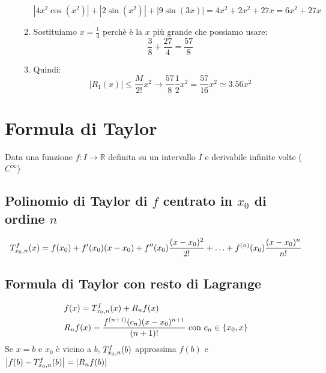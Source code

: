 \documentclass[10pt, a4paper]{article}
\begin{document}
\begin{itemize}
\begin{enumerate}
\begin{equation*}
                    \left|4x^2\cos(x^2)\right|+\left|2\sin(x^2)\right|+\left|9\sin(3x)\right|=4x^2+2x^2+27x=6x^2+27x
                \end{equation*}
                \item Sostituiamo $x=\frac{1}{4}$ perchè è la $x$ più grande che possiamo usare: \begin{equation*}
                    \frac{3}{8}+\frac{27}{4}=\frac{57}{8}
                \end{equation*}
                \item Quindi: \begin{equation*}
                    \left|R_1(x)\right|\leq \frac{M}{2!}x^2\rightarrow\frac{57}{8}\frac{1}{2}x^2=\frac{57}{16}x^2\simeq 3.56x^2
                \end{equation*}
            \end{enumerate}
        \end{itemize}
\newpage
\section{Formula di Taylor}
    Data una funzione $f:I\rightarrow\mathbb{R}$ definita su un intervallo $I$ e derivabile infinite volte ($C^{\infty}$)
    \subsection{Polinomio di Taylor di $f$ centrato in $x_0$ di ordine $n$}
        \begin{equation*}
            \taylor{f}{x_0}{n}(x) = f(x_0)+f'(x_0)(x-x_0)+f''(x_0)\frac{(x-x_0)^2}{2!}+\ldots+f^{(n)}(x_0)\frac{(x-x_0)^n}{n!}
        \end{equation*}
    \subsection{Formula di Taylor con resto di Lagrange}
        \begin{equation*}
            \begin{split}
                &f(x) = \taylor{f}{x_0}{n}(x) + R_nf(x)\\
                &R_nf(x) = \frac{f^{(n+1)}(c_n)(x-x_0)^{n+1}}{(n+1)!} \text{ con } c_n\in\{x_0,x\}
            \end{split}
        \end{equation*}
        Se $x=b$ e $x_0$ è vicino a $b$, $\taylor{f}{x_0}{n}(b)$ approssima $f(b)$ e $\left|f(b)-\taylor{f}{x_0}{n}(b)\right| = \left|R_nf(b)\right|$
\end{document}
